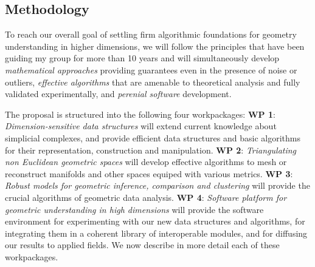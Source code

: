 



\subsection{Methodology}
To reach our overall goal of settling firm algorithmic foundations for geometry understanding in higher dimensions, we will follow the principles that have been guiding my group for more than 10 years and will simultaneously develop
{\em mathematical approaches} providing guarantees even in the presence of noise or outliers,
{\em effective algorithms} that are amenable to theoretical analysis and fully validated experimentally,
and {\em perenial software} development.

The proposal is structured into the following four workpackages:
{\bf WP 1}:  {\em Dimension-sensitive data  structures} will extend current knowledge about simplicial complexes, and  provide efficient data structures and basic algorithms for their representation, construction and manipulation. 
  {\bf WP 2}:  {\em Triangulating non Euclidean geometric spaces} will develop effective algorithms to mesh or reconstruct manifolds and other spaces equiped with various metrics.   {\bf WP 3}: {\em Robust models for geometric inference, comparison and  clustering} will provide the crucial  algorithms of geometric data analysis.
 {\bf WP 4}:  {\em  Software platform for geometric understanding in high dimensions} will provide the software environment for experimenting with our new data structures and algorithms, for integrating them in a coherent library of interoperable modules, and for diffusing our results to applied fields. We now describe in more detail each of these workpackages.



